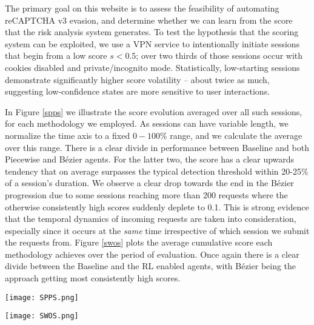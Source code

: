 The primary goal on this website is to assess the feasibility of automating reCAPTCHA v3 evasion, and determine whether we can learn from the score that the risk analysis system generates.
To test the hypothesis that the scoring system can be exploited, we use a \gls{VPN} service to intentionally initiate sessions that begin from a low score $s < 0.5$; over two thirds of those sessions occur with cookies disabled and private/incognito mode.
Statistically, low-starting sessions demonstrate significantly higher score volatility -- about twice as much, suggesting low-confidence states are more sensitive to user interactions.

In Figure \ref{spps} we illustrate the score evolution averaged over all such sessions, for each methodology we employed.
As sessions can have variable length, we normalize the time axis to a fixed $0-100\%$ range, and we calculate the average over this range.
There is a clear divide in performance between Baseline and both Piecewise and Bézier agents.
For the latter two, the score has a clear upwards tendency that on average surpasses the typical detection threshold within 20-25\% of a session's duration.
We observe a clear drop towards the end in the Bézier progression due to some sessions reaching more than 200 requests where the otherwise consistently high scores suddenly deplete to 0.1.
This is strong evidence that the temporal dynamics of incoming requests are taken into consideration, especially since it occurs at the \emph{same} time irrespective of which session we submit the requests from.
Figure \ref{swos} plots the average cumulative score each methodology achieves over the period of evaluation.
Once again there is a clear divide between the Baseline and the \gls{RL} enabled agents, with Bézier being the approach getting most consistently high scores.

\begin{figure*}[ht!]
  \centerline{\texttt{[image: SPPS.png]}}
  \caption[reCaptcha score evolution in sessions initially flagged as bot]{Score evolution in sessions initially flagged as bot, on Website A and Website B.}
  \label{spps}
  \end{figure*}

\begin{figure*}[ht!]
\centerline{\texttt{[image: SWOS.png]}}
\caption[Average cumulative score over the period of evaluation.]{Average cumulative score over the period of evaluation, for Website A and Website B.}
\label{swos}
\end{figure*}

